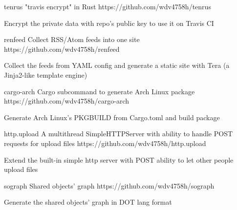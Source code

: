 \begin{cvopensources}
  \cvopensource
    {tenrus}   %
    {"travis encrypt" in Rust}  %
    {https://github.com/wdv4758h/tenrus}
    {
      \begin{cvitems}
        \item {Encrypt the private data with repo's public key to use it on Travis CI}
      \end{cvitems}
    }

  \cvopensource
    {renfeed}   %
    {Collect RSS/Atom feeds into one site}  %
    {https://github.com/wdv4758h/renfeed}
    {
      \begin{cvitems}
      \item {Collect the feeds from YAML config and generate a static site with Tera (a Jinja2-like template engine)}
      \end{cvitems}
    }

  \cvopensource
    {cargo-arch}   %
    {Cargo subcommand to generate Arch Linux package}  %
    {https://github.com/wdv4758h/cargo-arch}
    {
      \begin{cvitems}
        \item {Generate Arch Linux's PKGBUILD from Cargo.toml and build package}
      \end{cvitems}
    }

  \cvopensource
    {http.upload}   %
    {A multithread SimpleHTTPServer with ability to handle POST requests for upload files}
    {https://github.com/wdv4758h/http.upload}
    {
      \begin{cvitems}
        \item {Extend the built-in simple http server with POST ability to let other people upload files}
      \end{cvitems}
    }

  \cvopensource
    {sograph}   %
    {Shared objects' graph}  %
    {https://github.com/wdv4758h/sograph}
    {
      \begin{cvitems}
        \item {Generate the shared objects' graph in DOT lang format}
      \end{cvitems}
    }


\end{cvopensources}
